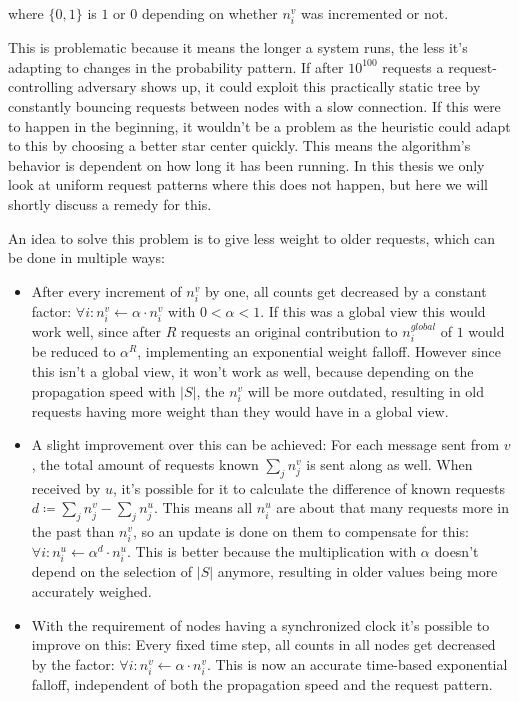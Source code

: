 \documentclass[a4paper, oneside]{discothesis}
\begin{document}
where $\{0,1\}$ is $1$ or $0$ depending on whether $n_i^v$ was incremented or not.

This is problematic because it means the longer a system runs, the less it's adapting to changes in the probability pattern. If after $10^{100}$ requests a request-controlling adversary shows up, it could exploit this practically static tree by constantly bouncing requests between nodes with a slow connection. If this were to happen in the beginning, it wouldn't be a problem as the heuristic could adapt to this by choosing a better star center quickly. This means the algorithm's behavior is dependent on how long it has been running. In this thesis we only look at uniform request patterns where this does not happen, but here we will shortly discuss a remedy for this.

An idea to solve this problem is to give less weight to older requests, which can be done in multiple ways:
\begin{itemize}
\item After every increment of $n_i^v$ by one, all counts get decreased by a constant factor: $\forall i:n_i^v\gets \alpha\cdot n_i^v$ with $0<\alpha<1$. If this was a global view this would work well, since after $R$ requests an original contribution to $n_i^{global}$ of $1$ would be reduced to $\alpha^R$, implementing an exponential weight falloff. However since this isn't a global view, it won't work as well, because depending on the propagation speed with $|S|$, the $n_i^v$ will be more outdated, resulting in old requests having more weight than they would have in a global view.
\item A slight improvement over this can be achieved: For each message sent from $v$, the total amount of requests known $\sum_jn_j^v$ is sent along as well. When received by $u$, it's possible for it to calculate the difference of known requests $d\coloneqq\sum_jn_j^v-\sum_jn_j^u$. This means all $n_i^u$ are about that many requests more in the past than $n_i^v$, so an update is done on them to compensate for this: $\forall i:n_i^u\gets\alpha^d\cdot n_i^u$. This is better because the multiplication with $\alpha$ doesn't depend on the selection of $|S|$ anymore, resulting in older values being more accurately weighed.
\item With the requirement of nodes having a synchronized clock it's possible to improve on this: Every fixed time step, all counts in all nodes get decreased by the factor: $\forall i:n_i^v\gets \alpha\cdot n_i^v$. This is now an accurate time-based exponential falloff, independent of both the propagation speed and the request pattern.
\end{itemize}
\end{document}
